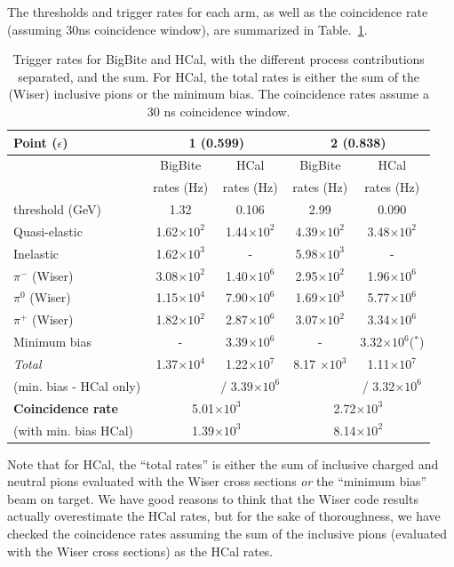 The thresholds and trigger rates for each arm, as well as the coincidence rate (assuming 30ns coincidence window), are summarized in Table.~\ref{tab:TrigRates}.
\begin{table}[h]
\centering
\begin{tabular}{|l|c|c|c|c|}
\hline
Point ($\epsilon$) & \multicolumn{2}{|c|}{1 (0.599)} & \multicolumn{2}{c|}{2 (0.838)} \\
\hline
& BigBite & HCal & BigBite & HCal \\ 
& rates (Hz) & rates (Hz) & rates (Hz) & rates (Hz) \\
\hline
threshold (GeV) & 1.32 & 0.106 & 2.99 & 0.090 \\
\hline
Quasi-elastic   & 1.62$\times 10^{2}$ & 1.44$\times 10^{2}$ & 4.39$\times 10^{2}$ & 3.48$\times 10^{2}$ \\
Inelastic       & 1.62$\times 10^{3}$ & - & 5.98$\times 10^{3}$ & - \\
$\pi^-$ (Wiser) & 3.08$\times 10^{2}$ & 1.40$\times 10^{6}$ & 2.95$\times 10^{2}$ & 1.96$\times 10^{6}$ \\
$\pi^0$ (Wiser) & 1.15$\times 10^{4}$ & 7.90$\times 10^{6}$ & 1.69$\times 10^{3}$ & 5.77$\times 10^{6}$ \\
$\pi^+$ (Wiser) & 1.82$\times 10^{2}$ & 2.87$\times 10^{6}$ & 3.07$\times 10^{2}$ & 3.34$\times 10^{6}$ \\
Minimum bias    & - & 3.39$\times 10^{6}$ & - & 3.32$\times 10^{6}$($^*$) \\ 
\hline
{\em Total} & 1.37$\times 10^{4}$ & 1.22$\times 10^{7}$ & 8.17 $\times 10^{3}$ & 1.11$\times 10^{7}$ \\
(min. bias - HCal only) &  & / 3.39$\times 10^{6}$ &  & / 3.32$\times 10^{6}$ \\
\hline
{\bf Coincidence rate} & \multicolumn{2}{|c|}{5.01$\times 10^{3}$} & \multicolumn{2}{c|}{2.72$\times 10^{3}$} \\
(with min. bias HCal) & \multicolumn{2}{|c|}{1.39$\times 10^{3}$} & \multicolumn{2}{|c|}{8.14$\times 10^{2}$} \\
\hline
\end{tabular} 
\caption{Trigger rates for BigBite and HCal, with the different process contributions separated, and the sum. For HCal, the total rates is either the sum of the (Wiser) inclusive pions or the minimum bias. The coincidence rates assume a 30 ns coincidence window.}
\label{tab:TrigRates}
\end{table}
Note that for HCal, the ``total rates'' is either the sum of inclusive charged and neutral pions evaluated with the Wiser cross sections {\em or} the ``minimum bias'' beam on target. We have good reasons to think that the Wiser code results actually overestimate the HCal rates, but for the sake of thoroughness, we have checked the coincidence rates assuming the sum of the inclusive pions (evaluated with the Wiser cross sections) as the HCal rates.

